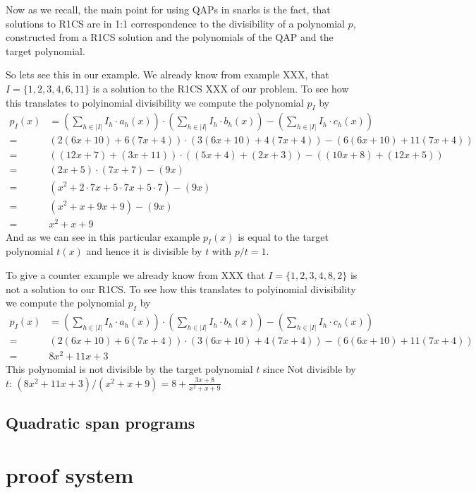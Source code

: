\begin{example}
Now as we recall, the main point for using QAPs in snarks is the fact, that solutions to R1CS are in 1:1 correspondence to the divisibility of a polynomial $p$, constructed from a R1CS solution and the polynomials of the QAP and the target polynomial.

So lets see this in our example. We already know from example XXX, that 
$I=\{1,2,3,4,6,11\}$ is a solution to the R1CS XXX of our problem. To see how this translates to polyinomial divisibility we compute the polynomial $p_I$ by
\begin{align*}
p_I(x)& = (\sum_{h\in |I|} I_h\cdot a_h(x))\cdot 
(\sum_{h\in |I|} I_h\cdot b_h(x)) - 
(\sum_{h\in |I|} I_h\cdot c_h(x)) \\
= & (2(6x+10)+6(7x+4))\cdot(3(6x+10)+4(7x+4))-(6(6x+10)+11(7x+4)) \\
= & ((12x+7)+(3x+11))\cdot((5x+4)+(2x+3))-((10x+8)+(12x+5)) \\
= & (2x+5)\cdot(7x+7)-(9x) \\
= & (x^{2}+2\cdot7x+5\cdot7x+5\cdot7)-(9x) \\
= & (x^{2}+x+9x+9)-(9x) \\
= & x^{2}+x+9
\end{align*}
And as we can see in this particular example $p_I(x)$ is equal to the target polynomial $t(x)$ and hence it is divisible by $t$ with $p/t=1$.

To give a counter example we already know from XXX that $I=\{1,2,3,4,8, 2\}$ is not a solution to our R1CS. To see how this translates to polyinomial divisibility we compute the polynomial $p_I$ by
\begin{align*}
p_I(x)& = (\sum_{h\in |I|} I_h\cdot a_h(x))\cdot 
(\sum_{h\in |I|} I_h\cdot b_h(x)) - 
(\sum_{h\in |I|} I_h\cdot c_h(x)) \\
= & (2(6x+10)+6(7x+4))\cdot(3(6x+10)+4(7x+4))-(6(6x+10)+11(7x+4)) \\
= & 8x^{2}+11x+3
\end{align*}
This polynomial is not divisible by the target polynomial $t$ since
Not divisible by $t$: $(8x^{2}+11x+3)/(x^{2}+x+9) =8+\frac{3x+8}{x^{2}+x+9} $
\end{example}



\subsection{Quadratic span programs}

\section{proof system}
